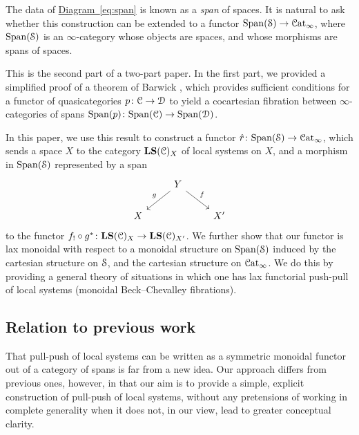 \documentclass[main.tex]{subfiles}
\begin{document}
The data of \hyperref[eq:span]{Diagram~\ref*{eq:span}} is known as a \emph{span} of spaces. It is natural to ask whether this construction can be extended to a functor $\Span(\S) \to \ICat$, where $\Span(\S)$ is an $\infty$-category whose objects are spaces, and whose morphisms are spans of spaces.

This is the second part of a two-part paper. In the first part, we provided a simplified proof of a theorem of Barwick \cite[Thm.~12.2]{spectralmackeyfunctors1}, which provides sufficient conditions for a functor of quasicategories $p\colon \category{C} \to \category{D}$ to yield a cocartesian fibration between $\infty$-categories of spans $\Span(p)\colon \Span(\category{C}) \to \Span(\category{D})$.

In this paper, we use this result to construct a functor $\hat{r}\colon \Span(\category{S}) \to \ICat$, which sends a space $X$ to the category $\LS(\category{C})_{X}$ of local systems on $X$, and a morphism in $\Span(\S)$ represented by a span
\begin{equation*}
  \begin{tikzcd}
    & Y
    \arrow[dl, swap, "g"]
    \arrow[dr, "f"]
    \\
    X
    && X'
  \end{tikzcd}
\end{equation*}
to the functor $f_{!} \circ g^{*}\colon \LS(\category{C})_{X} \to \LS(\category{C})_{X'}$. We further show that our functor is lax monoidal with respect to a monoidal structure on $\Span(\S)$ induced by the cartesian structure on $\S$, and the cartesian structure on $\ICat$. We do this by providing a general theory of situations in which one has lax functorial push-pull of local systems (monoidal Beck--Chevalley fibrations).

\subsection{Relation to previous work}
\label{ssc:relation_to_previous_work}

That pull-push of local systems can be written as a symmetric monoidal functor out of a category of spans is far from a new idea. Our approach differs from previous ones, however, in that our aim is to provide a simple, explicit construction of pull-push of local systems, without any pretensions of working in complete generality when it does not, in our view, lead to greater conceptual clarity.
\end{document}
